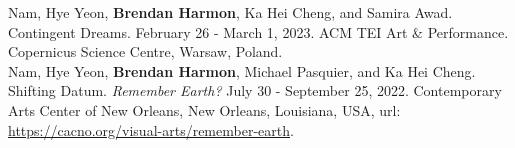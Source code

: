 \documentclass[10pt]{developercv} %
\begin{document}
\clearpage


\nocite{*}
\setlength\bibitemsep{0.75em}

\printbibliography[title={\cvsect{Books}}, type=book, heading=subbibliography]

\printbibliography[title={\cvsect{Papers}}, keyword=peer_reviewed, heading=subbibliography]

\clearpage

\printbibliography[title={\cvsect{Chapters}}, type=incollection, heading=subbibliography]

\printbibliography[title={\cvsect{Select presentations}}, type=unpublished, heading=subbibliography]

\printbibliography[title={\cvsect{Reports}}, type=report, heading=subbibliography]


\printbibliography[title={\cvsect{Software}}, type=software, heading=subbibliography]


\printbibliography[title={\cvsect{Datasets}}, type=dataset, heading=subbibliography]

\clearpage



Nam, Hye Yeon, \textbf{Brendan Harmon}, Ka Hei Cheng, and Samira Awad. Contingent Dreams. February 26 - March 1, 2023. ACM TEI Art \& Performance. Copernicus Science Centre, Warsaw, Poland.\\

Nam, Hye Yeon, \textbf{Brendan Harmon}, Michael Pasquier, and Ka Hei Cheng. Shifting Datum. \emph{Remember Earth?} July 30 - September 25, 2022. Contemporary Arts Center of New Orleans, New Orleans, Louisiana, USA, url: \url{https://cacno.org/visual-arts/remember-earth}.\\
\end{document}
